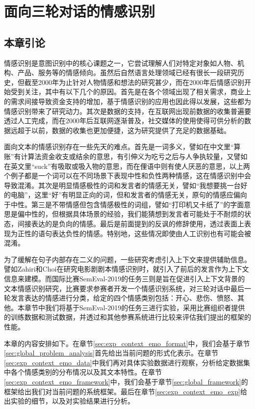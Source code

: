 \chapter{面向三轮对话的情感识别}
\label{cha:exp_context_emo}

\section{本章引论}

情感识别是意图识别中的核心课题之一，它尝试理解人们对特定对象如人物、机构、产品、服务等的情感倾向。虽然后自然语言处理领域已经有很长一段研究历史，但截至2000年为止针对人物情感和想法的研究甚少\cite{liu2012sentiment}，而在2000年后情感识别开始受到关注，其中有以下几个的原因。首先是在各个领域出现了相关需求，商业上的需求间接导致资金支持的增加，基于情感识别的应用也因此得以发展，这些都为情感识别带来了研究动力。其次是数据的支持，在互联网出现前数据的收集普遍要透过人工完成，而在2000年后互联网逐渐普及，社交媒体的使用使得可供分析的数据远超于以前，数据的收集也更加便捷，这为研究提供了充足的数据基础。

面向文本的情感识别存在一些先天的难点。首先是一词多义，譬如在中文里“算账”有计算法资金收支或结余的意思，有引伸义为吃亏之后与人争执较量，又譬如在英文里“suck”有吸取或吸入物的意思，而在俚语中则有使人厌恶的意思，以上两个例子都是一个词可以在不同场景下表现中性和负性两种情感，这在情感识别中会导致混淆。其次是明显情感极性的词和发言者的情感无关，譬如“我想要挑一台好的电脑”，这里“好”有明显正向的词，但和发言者的情感无关，原句的情感应偏向于中性。第三是不带情感但包含情感极性的词组，譬如“打印机又卡纸了”的字面意思是偏中性的，但根据具体场景的经验，我们能猜想到发言者可能处于不耐烦的状态，间接表达的是负向的情感。最后是前面提到的反讽的修辞使用，透过表面上表现为正性的语句表达负性的情感。特别地，这些情况即使由人工识别也有可能会被混淆。

为了缓解在句子内部存在二义的问题，一些研究考虑引入上下文来提供辅助信息。譬如Zahiri和Choi\cite{Zahiri2017Emotion}在研究电影剧剧本情感识别时，就引入了前后的发言作为上下文信息来建模。而国际比赛SemEval-2019的任务三\cite{SemEval2019Task3}则是旨在促进引入上下文背景的文本情感识别研究，比赛要求参赛者开发一个情感识别系统，对三轮对话中最后一轮发言表达的情感进行分类，给定的四个情感类别包括：开心、悲伤、愤怒、其他。本章节中我们将基于SemEval-2019的任务三进行实验，采用比赛组织者提供的训练数据和测试数据，并透过和其他参赛系统进行比较来评估我们提出的框架的性能。

本章的内容安排如下。在章节\ref{sec:exp_context_emo_format}中，我们会基于章节\ref{sec:global_problem_analysis}首先给出当前问题的形式化表示。在章节\ref{sec:exp_context_emo_data}中我们再对具体实验数据进行观察，分析给定数据集中各个情感类别的分布情况以及其文本特性。在章节\ref{sec:exp_context_emo_framework}中，我们会基于章节\ref{sec:global_framework}的框架给出我们对当前问题的系统框架。最后在章节\ref{sec:exp_context_emo_exp}给出实验的细节，以及对实验结果进行分析。

